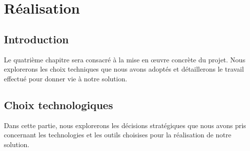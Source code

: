 \chapter{Réalisation}
	
\section*{Introduction}
    Le quatrième chapitre sera consacré à la mise en œuvre concrète du projet.
     Nous explorerons les choix techniques que nous avons adoptés et détaillerons le travail effectué pour donner vie à notre solution.

\section{Choix technologiques}
\par  Dans cette partie, nous explorerons les décisions stratégiques que nous avons pris concernant les technologies et les outils choisises pour la réalisation de notre solution.     
